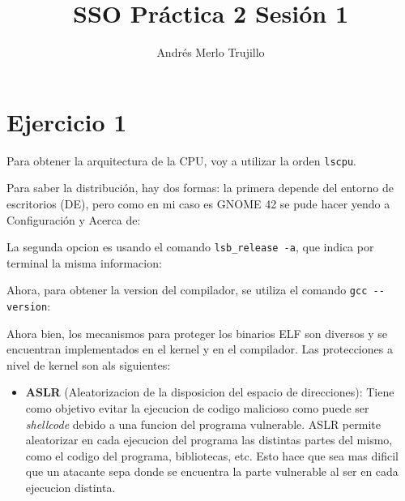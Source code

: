 \documentclass{article}
\title{SSO Práctica 2 Sesión 1}
\author{Andrés Merlo Trujillo}
\date{}
\begin{document}
\maketitle

\tableofcontents

\newpage

\section*{Ejercicio 1}

Para obtener la arquitectura de la CPU, voy a utilizar la orden \verb|lscpu|.


Para saber la distribución, hay dos formas: la primera depende del entorno de escritorios (DE), pero como en mi caso es GNOME 42 se pude hacer yendo a Configuración y Acerca de:


La segunda opcion es usando el comando \verb|lsb_release -a|, que indica por terminal la misma informacion:



Ahora, para obtener la version del compilador, se utiliza el comando \verb|gcc --version|:



Ahora bien, los mecanismos para proteger los binarios ELF son diversos y se encuentran implementados en el kernel y en el compilador. Las protecciones a nivel de kernel son als siguientes:

\begin{itemize}
    \item \textbf{ASLR} (Aleatorizacion de la disposicion del espacio de direcciones): Tiene como objetivo evitar la ejecucion de codigo malicioso como puede ser \textit{shellcode} debido a una funcion del programa vulnerable. ASLR permite aleatorizar en cada ejecucion del programa las distintas partes del mismo, como el codigo del programa, bibliotecas, etc. Esto hace que sea mas dificil que un atacante sepa donde se encuentra la parte vulnerable al ser en cada ejecucion distinta.
\end{itemize}
\end{document}
